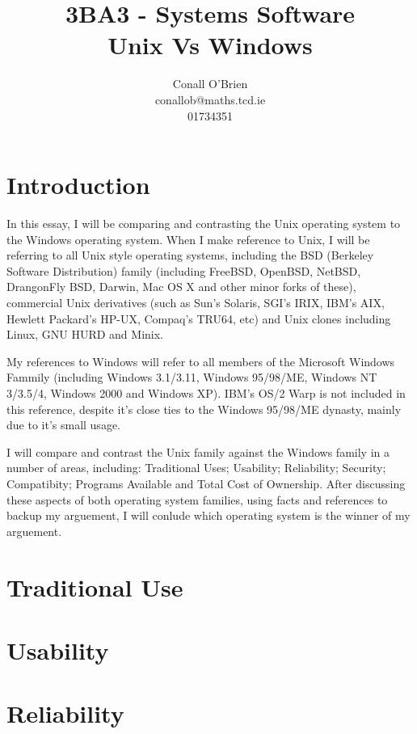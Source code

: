 \documentclass[a4paper,12pt]{article}
\begin{document}
\title{3BA3 - Systems Software \\ Unix Vs Windows}

\author{Conall O'Brien \\ conallob@maths.tcd.ie \\ 01734351 }

\maketitle

\section*{Introduction}

In this essay, I will be comparing and contrasting the Unix operating
system to the Windows operating system. When I make reference to Unix, I
will be referring to all Unix style operating systems, including the BSD
(Berkeley Software Distribution) family (including FreeBSD, OpenBSD,
NetBSD, DrangonFly BSD, Darwin, Mac OS X and other minor forks of
these), commercial Unix derivatives (such as Sun's Solaris, SGI's IRIX,
IBM's AIX, Hewlett Packard's HP-UX, Compaq's TRU64, etc) and Unix
clones including Linux, GNU HURD and Minix.

My references to Windows will refer to all members of the Microsoft
Windows Fammily (including Windows 3.1/3.11, Windows 95/98/ME, Windows NT 
3/3.5/4, Windows 2000 and Windows XP). IBM's OS/2 Warp is not included
in this reference, despite it's close ties to the Windows 95/98/ME
dynasty, mainly due to it's small usage.

I will compare and contrast the Unix family against the Windows family
in a number of areas, including: Traditional Uses; Usability;
Reliability; Security; Compatibity; Programs Available and Total Cost of
Ownership. After discussing these aspects of both operating system 
families, using facts and references to backup my arguement, I will
conlude which operating system is the winner of my arguement.

\section*{Traditional Use}

\section*{Usability}

\section*{Reliability}
\end{document}

